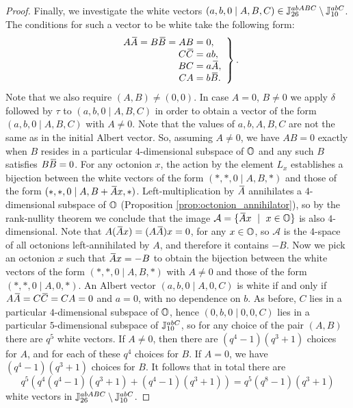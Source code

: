 \begin{proof}
	Finally, we investigate the white vectors $(a,b,0\mid A,B,C) \in 
	 \mathbb{J}_{26}^{abABC}\setminus\mathbb{J}_{10}^{abC}$. The conditions for such a vector 
	 to be white take the following form:
	 \begin{equation}
		\left.\begin{array}{r@{\;}c@{\;}l}
			A \ovA=B\ovB = AB & = & 0, \\
			C \ovC & = & ab, \\
			BC & = & a\ovA, \\
			CA & = & b\ovB.
		\end{array}
		\right\}.
	\end{equation}
	Note that we also require $(A,B) \neq (0,0)$. In case $A = 0$, $B\neq 0$ we apply
	$\delta$ followed by $\tau$ to $(a,b,0\mid A,B,C)$ in order to obtain a 
	vector of the form $(a,b,0\mid A,B,C)$ with $A \neq 0$. Note that the values
	of $a,b,A,B,C$ are not the same as in the initial Albert vector. So, assuming 
	$A \neq 0$, we have $AB = 0$ exactly when $B$ resides in a particular $4$-dimensional
	subspace of $\mathbb{O}$ and any such $B$ satisfies $B\mathord{\mbox{\hspace*{0pt}}\,\overline{\!B\!\!\;}\!\:}\mbox{\hspace*{0pt}} = 0$. For any octonion $x$, the
	action by the element $L_x$ establishes a bijection between the white vectors of
	the form $(*,*,0\mid A,B,*)$ and those of the form \mbox{$(*,*,0\mid A,B+\mathord{\mbox{\hspace*{0pt}}\,\overline{\!A\!\!\;}\!\:}\mbox{\hspace*{0pt}} x,*)$}.
	Left-multiplication by $\mathord{\mbox{\hspace*{0pt}}\,\overline{\!A\!\!\;}\!\:}\mbox{\hspace*{0pt}}$ annihilates a $4$-dimensional subspace of $\mathbb{O}$
	(Proposition \ref{prop:octonion_annihilator}), so by
	the rank-nullity theorem we conclude that the image 
	$\mathcal{A} = \{ \mathord{\mbox{\hspace*{0pt}}\,\overline{\!A\!\!\;}\!\:}\mbox{\hspace*{0pt}} x\ \mid\ x \in \mathbb{O} \}$ is also $4$-dimensional. Note that
	$A (\ovA x) = (A\ovA)x = 0$, for any $x \in \mathbb{O}$, so $\mathcal{A}$ is the $4$-space
	of all octonions left-annihilated by $A$, and therefore it contains $-B$. 
	Now we pick an octonion $x$ such that $\mathord{\mbox{\hspace*{0pt}}\,\overline{\!A\!\!\;}\!\:}\mbox{\hspace*{0pt}} x = -B$ to obtain the bijection between
	the white vectors of the form $(*,*,0\mid A,B,*)$ with $A\neq 0$ and those of the form 
	$(*,*,0\mid A,0,*)$. An Albert vector $(a,b,0\mid A,0,C)$ is white if and only if
	$A\ovA = C\ovC = CA = 0$ and $a = 0$, with no dependence on $b$. As before, $C$ lies in a
	particular $4$-dimensional subspace of $\mathbb{O}$, hence $(0,b,0\mid 0,0,C)$ lies in a
	particular $5$-dimensional subspace of $\mathbb{J}_{10}^{abC}$, so for any choice of the 
	pair $(A,B)$ there are $q^5$ white vectors. If $A \neq 0$, then there are
	$(q^4-1)(q^3+1)$ choices for $A$, and for each of these $q^4$ choices for $B$.
	If $A = 0$, we have $(q^4-1)(q^3+1)$ choices for $B$. It follows that in total there
	are
	\begin{equation*}
		q^5 ( q^4(q^4-1)(q^3+1) + (q^4-1)(q^3+1) ) = q^5(q^8-1)(q^3+1)
	\end{equation*}
	white vectors in $\mathbb{J}_{26}^{abABC}\setminus\mathbb{J}_{10}^{abC}$.
	

\end{proof}
